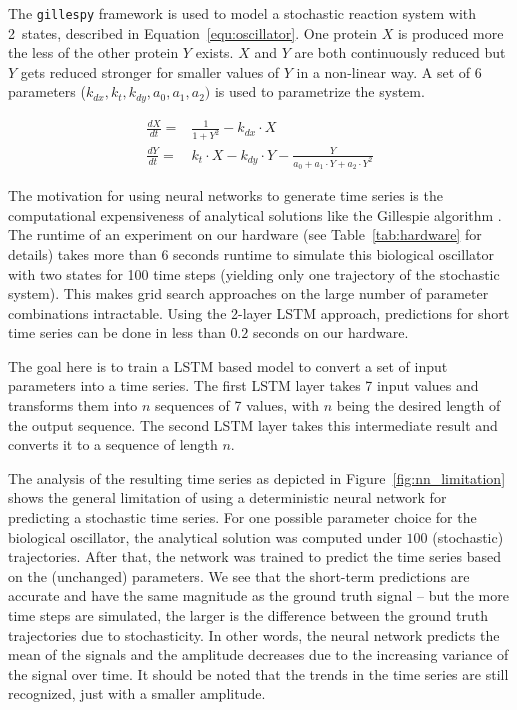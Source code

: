 The \texttt{gillespy} framework is used to 
model a stochastic reaction system with 2~states, described 
in Equation~\ref{equ:oscillator}.
One protein $X$ is produced more the less of the other protein $Y$
exists. $X$ and $Y$ are both continuously reduced but $Y$ gets reduced stronger
for smaller values of $Y$ in a non-linear way. A set of 6 parameters
($k_{dx}, k_t, k_{dy}, a_0, a_1, a_2)$
is used to parametrize the system.

\begin{align}
    \frac{dX}{dt} = & \frac{1}{1+Y^2} - k_{dx} \cdot X                                           \\
    \frac{dY}{dt} = & k_t \cdot X - k_{dy} \cdot Y - \frac{Y}{a_0 + a_1 \cdot Y + a_2 \cdot Y^2}
    \label{equ:oscillator}
\end{align}

The motivation for using neural networks to generate time series is the
computational expensiveness of analytical solutions like the Gillespie
algorithm \cite{gillespie1977}. The runtime of an experiment on our hardware
(see Table~\ref{tab:hardware} for details)
takes more than 6 seconds runtime to simulate this biological oscillator with
two states for 100 time steps (yielding only one trajectory of the stochastic
system). This makes grid search approaches on the large number
of parameter
combinations intractable. Using the 2-layer LSTM approach, predictions for
short time series can be done in less than $0.2$ seconds on our hardware.

The goal here is to train a LSTM based
model to convert a set of input parameters into a time series. The first
LSTM layer
takes 7 input values and transforms them into $n$ sequences of 7 values, with
$n$ being the desired length of the output sequence. The second LSTM layer
takes this intermediate result and converts it to a sequence of length $n$.

The analysis of the resulting time series as depicted in
Figure~\ref{fig:nn_limitation} shows the general limitation of using a
deterministic neural network for predicting a stochastic time series. For one
possible parameter choice for the biological oscillator, the analytical solution
was computed under $100$ (stochastic) trajectories. After that, the network was
trained to predict the time series based on the (unchanged) parameters. We see
that the short-term predictions are accurate and have the same magnitude as the
ground truth signal -- but the more time steps are simulated, the larger is the
difference between the ground truth trajectories due to stochasticity. In other
words, the neural network predicts the mean of the signals and the amplitude
decreases due to the increasing variance of the signal over time.
It should be noted that the trends in the time series are still
recognized, just with a smaller amplitude.

